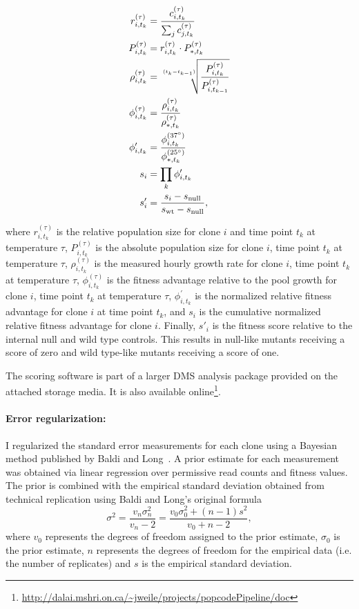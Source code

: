 \begin{align*}
r_{i,t_k}^{(\tau)} &= \frac{ c_{i,t_k}^{(\tau)} }{ \sum_j c_{j,t_k}^{(\tau)} }\\
P_{i,t_k}^{(\tau)} &= r_{i,t_k}^{(\tau)} \cdot P_{*,t_k}^{(\tau)} \\
\rho_{i,t_k}^{(\tau)} &= \sqrt[\uproot{5}(t_k - t_{k-1})]{\frac{P_{i,t_k}^{(\tau)}}{P_{i,t_{k-1}}^{(\tau)}}} \\
\phi_{i,t_k}^{(\tau)} &= \frac{\rho_{i,t_k}^{(\tau)}}{\rho_{*,t_k}^{(\tau)}}\\
\phi_{i,t_k}^\prime &= \frac{\phi_{i,t_k}^{(37^{\circ})}}{\phi_{*,t_k}^{(25^{\circ})}}\\
s_i &= \prod_k \phi_{i,t_k}^\prime \\
s'_i &= \frac{s_i - s_\text{null}}{s_\text{wt} - s_\text{null}},
\end{align*}

where $r_{i,t_k}^{(\tau)}$ is the relative population size for clone $i$ and time point $t_k$ at temperature $\tau$, $P_{i,t_k}^{(\tau)}$ is the absolute population size for clone $i$, time point $t_k$ at temperature $\tau$, $\rho_{i,t_k}^{(\tau)}$ is the measured hourly growth rate for clone $i$, time point $t_k$ at temperature $\tau$, $\phi_{i,t_k}^{(\tau)}$ is the fitness advantage relative to the pool growth for clone $i$, time point $t_k$ at temperature $\tau$, $\phi_{i,t_k}^\prime$ is the normalized relative fitness advantage for clone $i$ at time point $t_k$, and $s_i$ is the cumulative normalized relative fitness advantage for clone $i$. Finally, $s'_i$ is the fitness score relative to the internal null and wild type controls. This results in null-like mutants receiving a score of zero and wild type-like mutants receiving a score of one.

The scoring software is part of a larger DMS analysis package provided on the attached storage media. It is also available online\footnote{\url{http://dalai.mshri.on.ca/~jweile/projects/popcodePipeline/doc}}.

\paragraph{Error regularization: } I regularized the standard error measurements for each clone using a Bayesian method published by Baldi and Long~\cite{baldi_bayesian_2001}. A prior estimate for each measurement was obtained via linear regression over permissive read counts and fitness values. The prior is combined with the empirical standard deviation obtained from technical replication using Baldi and Long's original formula $$\sigma^2 = \frac{v_n \sigma_n^2}{v_n - 2} = \frac{v_0 \sigma_0^2 + (n-1)s^2}{v_0 + n - 2},$$ where $v_0$ represents the degrees of freedom assigned to the prior estimate, $\sigma_0$ is the prior estimate, $n$ represents the degrees of freedom for the empirical data (i.e. the number of replicates) and $s$ is the empirical standard deviation.

